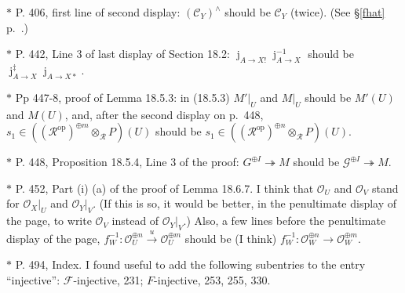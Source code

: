 \documentclass[12pt]{article}
\theoremstyle{remark}
\theoremstyle{definition}
\newcommand{\nn}{\noindent}
\newcommand{\cc}{\mathcal}
\newcommand{\A}{\mathcal A}
\newcommand{\C}{\mathcal C}
\newcommand{\epi}{\twoheadrightarrow}
\newcommand{\oo}{\operatorname}
\newcommand{\xr}{\xrightarrow}
\DeclareMathOperator{\jj}{j}
\DeclareMathOperator{\op}{op}
\begin{document}
\nn $*$ P. 406, first line of second display: $(\C_Y)^\wedge$ should be $\C_Y$ (twice). (See \S\ref{fhat} p.~\pageref{fhat}.)


\noindent $*$ P. 442, Line 3 of last display of Section 18.2: $\jj_{A\to X!}\jj_{A\to X}^{-1}$ should be $\jj_{A\to X}^\ddagger\jj_{A\to X*}$.

\noindent $*$ Pp 447-8, proof of Lemma 18.5.3: in (18.5.3) $M'|_U$ and $M|_U$ should be $M'(U)$ and $M(U)$, and, after the second display on p.~448, $s_1\in((\cc R^{\op})^{\oplus m}\otimes_{\cc R}P)(U)$ should be $s_1\in((\cc R^{\op})^{\oplus n}\otimes_{\cc R}P)(U)$.

\noindent $*$ P. 448, Proposition 18.5.4, Line 3 of the proof: $G^{\oplus I}\epi M$ should be $\cc G^{\oplus I}\epi M$.

\noindent $*$ P. 452, Part (i) (a) of the proof of Lemma 18.6.7. I think that $\cc O_U$ and $\cc O_V$ stand for $\cc O_X|_U$ and $\cc O_Y|_V$. (If this is so, it would be better, in the penultimate display of the page, to write $\cc O_V$ instead of $\cc O_Y|_V$.) Also, a few lines before the penultimate display of the page, $f_W^{-1}:\cc O_U^{\oplus n}\xr u\cc O_U^{\oplus m}$ should be (I think) $f_W^{-1}:\cc O_W^{\oplus n}\to\cc O_W^{\oplus m}$.

\noindent $*$ P. 494, Index. I found useful to add the following subentries to the entry ``injective'': $\cc F$-injective, 231; $F$-injective, 253, 255, 330.
%
\end{document}
